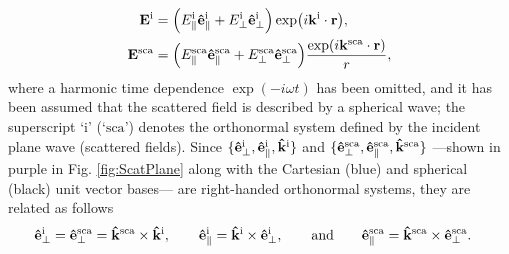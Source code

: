 %
%
%
%
 \begin{align}
	\vb{E}^\text{i} & =  \qty(E_\parallel^\text{i}\vu{e}^\text{i}_\parallel + E_\perp^\text{i} \vu{e}_\perp^\text{i}) \exp(i\vb{k}^\text{i}\cdot\vb{r}),
 \label{eq:Ei} \\
	\vb{E}^\text{sca} & = \qty(E_\parallel^\text{sca}\vu{e}^\text{sca}_\parallel + E_\perp^\text{sca} \vu{e}_\perp^\text{sca}) \frac{\exp(i\vb{k}^\text{sca}\cdot\vb{r})}{r},
 \label{eq:Es}
 \end{align}
%
where a harmonic time dependence $\exp(-i\omega t)$ has been omitted, and it has been assumed that the scattered field is described by a spherical wave; the superscript `$\text{i}$' (`$\text{sca}$') denotes the orthonormal system defined by the incident plane wave (scattered fields).  Since $\{\vu{e}_\perp^\text{i}, \vu{e}_\parallel^\text{i},\vu{k}^\text{i} \}$ and $\{\vu{e}_\perp^\text{sca}, \vu{e}_\parallel^\text{sca},\vu{k}^\text{sca} \}$ ---shown in purple in Fig. \ref{fig:ScatPlane}  along with the Cartesian (blue) and spherical (black) unit vector bases--- are right-handed orthonormal systems, they are related as follows
%
 \begin{align}
	\vu{e}_\perp^\text{i} = \vu{e}_\perp^\text{sca}  & =  \vu{k}^\text{sca} \times \vu{k}^\text{i},
		\qquad
	\vu{e}^\text{i}_\parallel = \vu{k}^\text{i}\times \vu{e}^\text{i}_\perp,
		\qquad\text{and}\qquad
	\vu{e}^\text{sca}_\parallel = \vu{k}^\text{sca} \times \vu{e}_\perp^\text{sca}.
 \label{eq:eParaPerp}
 \end{align}
%
